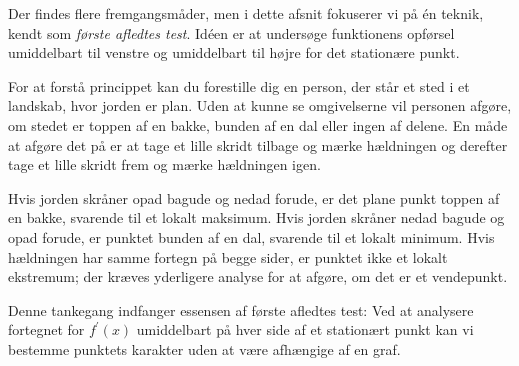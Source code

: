 Der findes flere fremgangsmåder, men i dette afsnit fokuserer vi på én teknik, kendt som \emph{første afledtes test}. Idéen er at undersøge funktionens opførsel umiddelbart til venstre og umiddelbart til højre for det stationære punkt.

For at forstå princippet kan du forestille dig en person, der står et sted i et landskab, hvor jorden er plan. Uden at kunne se omgivelserne vil personen afgøre, om stedet er toppen af en bakke, bunden af en dal eller ingen af delene. En måde at afgøre det på er at tage et lille skridt tilbage og mærke hældningen og derefter tage et lille skridt frem og mærke hældningen igen.

Hvis jorden skråner opad bagude og nedad forude, er det plane punkt toppen af en bakke, svarende til et lokalt maksimum. Hvis jorden skråner nedad bagude og opad forude, er punktet bunden af en dal, svarende til et lokalt minimum. Hvis hældningen har samme fortegn på begge sider, er punktet ikke et lokalt ekstremum; der kræves yderligere analyse for at afgøre, om det er et vendepunkt.

Denne tankegang indfanger essensen af første afledtes test: Ved at analysere fortegnet for \(f^{\prime}(x)\) umiddelbart på hver side af et stationært punkt kan vi bestemme punktets karakter uden at være afhængige af en graf.




